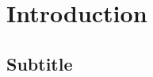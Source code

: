 \documentclass[11pt,a4paper]{article}
\begin{document}

\section{Introduction}




\subsection*{Subtitle}
\end{document}
